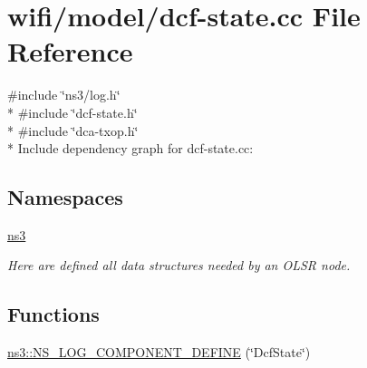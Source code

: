 \hypertarget{dcf-state_8cc}{}\section{wifi/model/dcf-\/state.cc File Reference}
\label{dcf-state_8cc}
{\ttfamily \#include \char`\"{}ns3/log.\+h\char`\"{}}\\*
{\ttfamily \#include \char`\"{}dcf-\/state.\+h\char`\"{}}\\*
{\ttfamily \#include \char`\"{}dca-\/txop.\+h\char`\"{}}\\*
Include dependency graph for dcf-\/state.cc\+:
\subsection*{Namespaces}
\begin{DoxyCompactItemize}
\item 
 \hyperlink{namespacens3}{ns3}
\begin{DoxyCompactList}\small\item\em Here are defined all data structures needed by an O\+L\+SR node. \end{DoxyCompactList}\end{DoxyCompactItemize}
\subsection*{Functions}
\begin{DoxyCompactItemize}
\item 
\hyperlink{namespacens3_a12e72c79e646cff192251248f029bdb2}{ns3\+::\+N\+S\+\_\+\+L\+O\+G\+\_\+\+C\+O\+M\+P\+O\+N\+E\+N\+T\+\_\+\+D\+E\+F\+I\+NE} (\char`\"{}Dcf\+State\char`\"{})
\end{DoxyCompactItemize}
